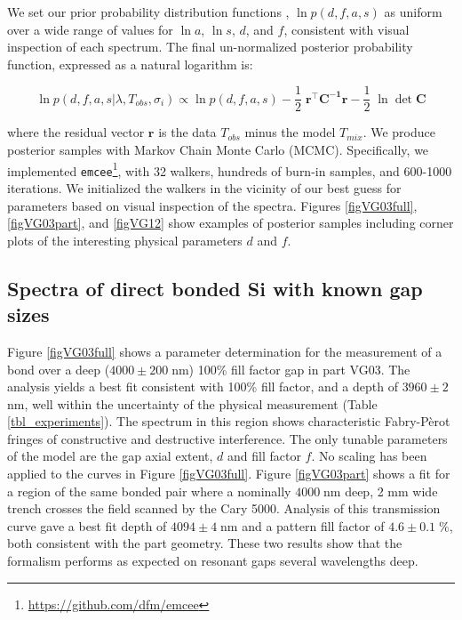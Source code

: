 We set our prior probability distribution functions \cite{2013sdmm.book.....I}, $\ln{p(d,f,a,s)}$ as uniform over a wide range of values for $\ln{a}$, $\ln{s}$, $d$, and $f$, consistent with visual inspection of each spectrum.  The final un-normalized posterior probability function, expressed as a natural logarithm is:

\begin{equation}
	\ln{p(d,f,a,s|\lambda, T_{obs}, \sigma_i)} \propto \ln{p(d,f,a,s)} -\frac{1}{2}\;\boldsymbol{r^\intercal}\boldsymbol{C^{-1}}\boldsymbol{r} -\frac{1}{2}\;\ln{\det{\boldsymbol{C}}} \label{eqnPosterior}
\end{equation}

where the residual vector $\boldsymbol{r}$ is the data $T_{obs}$ minus the model $T_{mix}$.  We produce posterior samples with Markov Chain Monte Carlo (MCMC).  Specifically, we implemented \texttt{emcee}\footnote{\url{https://github.com/dfm/emcee}}\cite{emcee}, with 32 walkers, hundreds of burn-in samples, and 600-1000 iterations.  We initialized the walkers in the vicinity of our best guess for parameters based on visual inspection of the spectra.  Figures \ref{figVG03full}, \ref{figVG03part}, and \ref{figVG12} show examples of posterior samples including corner plots of the interesting physical parameters $d$ and $f$.

\subsection{Spectra of direct bonded Si with known gap sizes}
\label{secKnownGaps}

Figure \ref{figVG03full} shows a parameter determination for the measurement of a bond over a deep ($4000 \pm 200\;$nm) 100\% fill factor gap in part VG03.  The analysis yields a best fit consistent with 100\% fill factor, and a depth of $3960 \pm 2\;$nm, well within the uncertainty of the physical measurement (Table \ref{tbl_experiments}).  The spectrum in this region shows characteristic Fabry-P\`erot fringes of constructive and destructive interference.  The only tunable parameters of the model are the gap axial extent, $d$ and fill factor $f$.  No scaling has been applied to the curves in Figure \ref{figVG03full}.  Figure \ref{figVG03part} shows a fit for a region of the same bonded pair where a nominally $4000\;$nm deep, 2 mm wide trench crosses the field scanned by the Cary 5000.  Analysis of this transmission curve gave a best fit depth of $4094 \pm 4\;$nm and a pattern fill factor of $4.6 \pm 0.1\;\%$, both consistent with the part geometry.  These two results show that the formalism performs as expected on resonant gaps several wavelengths deep.

